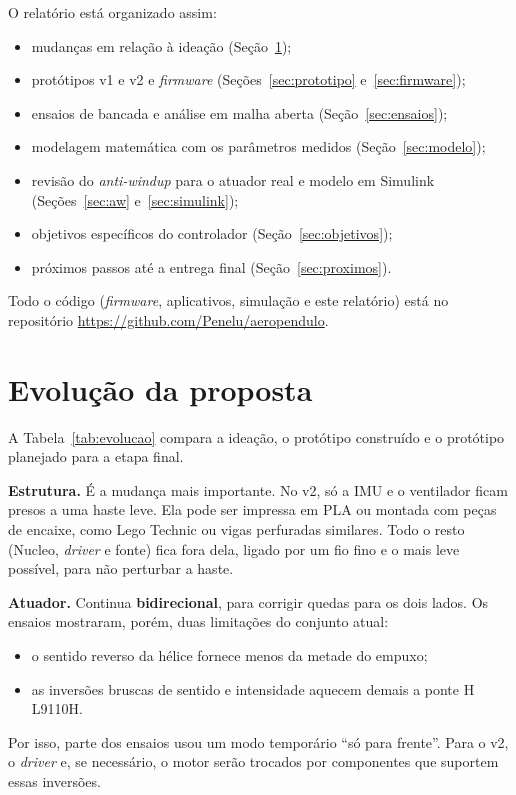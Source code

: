 \documentclass[a4paper,11pt]{article}
\newcommand{\repo}{\url{https://github.com/Penelu/aeropendulo}}
\begin{document}
O relatório está organizado assim:
\begin{itemize}
  \item mudanças em relação à ideação (Seção~\ref{sec:evolucao});
  \item protótipos v1 e v2 e \textit{firmware} (Seções~\ref{sec:prototipo} e~\ref{sec:firmware});
  \item ensaios de bancada e análise em malha aberta (Seção~\ref{sec:ensaios});
  \item modelagem matemática com os parâmetros medidos (Seção~\ref{sec:modelo});
  \item revisão do \textit{anti-windup} para o atuador real e modelo em Simulink
    (Seções~\ref{sec:aw} e~\ref{sec:simulink});
  \item objetivos específicos do controlador (Seção~\ref{sec:objetivos});
  \item próximos passos até a entrega final (Seção~\ref{sec:proximos}).
\end{itemize}
Todo o código (\textit{firmware}, aplicativos, simulação e este relatório) está no repositório \repo.

\section{Evolução da proposta}
\label{sec:evolucao}

A Tabela~\ref{tab:evolucao} compara a ideação, o protótipo construído e o protótipo planejado
para a etapa final.

\textbf{Estrutura.} É a mudança mais importante. No v2, só a IMU e o ventilador ficam presos a uma
haste leve. Ela pode ser impressa em PLA ou montada com peças de encaixe, como Lego Technic ou
vigas perfuradas similares. Todo o resto (Nucleo, \textit{driver} e fonte) fica fora dela, ligado
por um fio fino e o mais leve possível, para não perturbar a haste.

\textbf{Atuador.} Continua \textbf{bidirecional}, para corrigir quedas para os dois lados. Os ensaios
mostraram, porém, duas limitações do conjunto atual:
\begin{itemize}
  \item o sentido reverso da hélice fornece menos da metade do empuxo;
  \item as inversões bruscas de sentido e intensidade aquecem demais a ponte H L9110H.
\end{itemize}
Por isso, parte dos ensaios usou um modo temporário ``só para frente''. Para o v2, o
\textit{driver} e, se necessário, o motor serão trocados por componentes que suportem essas
inversões.
\end{document}
